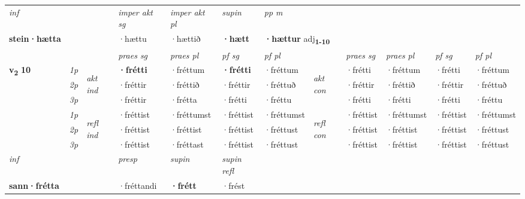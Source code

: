 \begin{longtable}[l]{X>{\footnotesize\itshape}llXXXXlXXXX}
   {\textit{inf}} & &  & \textit{imper akt sg} & \textit{imper akt pl}    & \textit{supin}  & \textit{pp m} \\*
  {\textbf{stein\allowbreak ·hætta}} & && ·hættu  & ·hættið    &  \textbf{·hætt}  & \multicolumn{2}{l}{\textbf{·hættur} adj\textbf{\textsubscript{1-10}}} \\*

\midrule

 & &   & \textit{praes sg}  & \textit{praes pl}    & \textit{ pf sg} & \textit{pf pl} & & \textit{praes sg}  & \textit{praes pl}    & \textit{pf sg} & \textit{pf pl }  \\ \cmidrule{4-7} \cmidrule{9-12}
 \multirow{2}{*}{{{\textbf{v{\textsubscript{2}}} \Large{\textbf{10}}}}}  & 1p & \multirow{3}{*}{\begin{turn}{90}\textit{akt ind}\end{turn}} & \textbf{·frétti} & ·fréttum & \textbf{·frétti} & ·fréttum & \multirow{3}{*}{\begin{turn}{90}\textit{akt con}\end{turn}} &·frétti & ·fréttum & ·frétti & ·fréttum\\*
 & 2p &  &  ·fréttir  & ·fréttið & ·fréttir & ·fréttuð & & ·fréttir & ·fréttið & ·fréttir & ·fréttuð \\*
 & 3p &  & ·fréttir & ·frétta & ·frétti & ·fréttu & & ·frétti & ·frétti& ·frétti & ·fréttu \\*
\cmidrule{4-7} \cmidrule{9-12}
 & 1p & \multirow{3}{*}{\begin{turn}{90}\textit{refl ind}\end{turn}}  & ·fréttist & ·fréttumst & ·fréttist & ·fréttumst & \multirow{3}{*}{\begin{turn}{90}\textit{refl con}\end{turn}}  &·fréttist & ·fréttumst & ·fréttist & ·fréttumst \\*
 & 2p &  & ·fréttist & ·fréttist & ·fréttist & ·fréttust & &·fréttist & ·fréttist & ·fréttist & ·fréttust \\*
 & 3p  & & ·fréttist & ·fréttast & ·fréttist & ·fréttust & & ·fréttist & ·fréttist& ·fréttist & ·fréttust \\*
\cmidrule{4-7} \cmidrule{9-12}

   {\textit{inf}} & &     & \textit{presp} & \textit{supin} & \textit{supin refl}  \\*
  {\textbf{sann\allowbreak ·frétta}} & &     & ·fréttandi &  \textbf{·frétt} & ·frést  \\*


\end{longtable}
